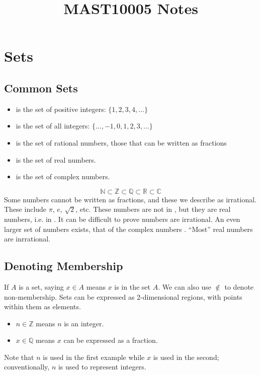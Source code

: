 \documentclass[12pt]{report}
\begin{document}
\title{MAST10005 Notes}
\chapter*{Sets}
\begin{flushleft}

\section*{Common Sets}
\begin{itemize}
\item {} is the set of positive integers: \(\{ 1, 2, 3, 4, ... \}\)
\item {} is the set of all integers: \(\{ ..., -1, 0, 1, 2, 3, ... \}\)
\item {} is the set of rational numbers, those that can be written as fractions
\item {} is the set of real numbers.
\item {} is the set of complex numbers.        
\end{itemize}


\[\mathbb{N} \subset \mathbb{Z} \subset \mathbb{Q} \subset \mathbb{R} \subset \mathbb{C}\]
Some numbers cannot be written as fractions, and these we describe as irrational. 
These include \(\pi\), \(e\), \(\sqrt{2}\), etc. These numbers are not in , but they are real numbers, i.e. in . 
It can be difficult to prove numbers are irrational. An even larger set of numbers exists, that of the complex numbers . ``Most'' real numbers are inrrational.


\section*{Denoting Membership}
If \(A\) is a set, saying \(x \in A\) means \(x\) is in the set \(A\). 
We can also use \(\notin\) to denote non-membership. 
Sets can be expressed as 2-dimensional regions, with points within them as elements.

\begin{itemize}
\item \(n \in \mathbb{Z}\) means \(n\) is an integer.
\item \(x \in \mathbb{Q}\) means \(x\) can be expressed as a fraction.
\end{itemize}

Note that \(n\) is used in the first example while \(x\) is used in the second; conventionally, \(n\) is used to represent integers.



\end{flushleft}
\end{document}
